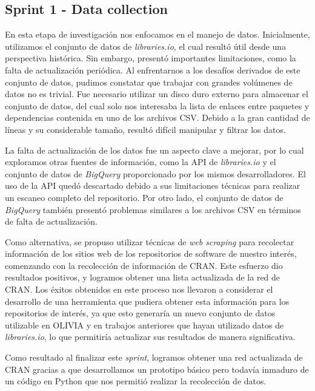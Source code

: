 \subsection{Sprint 1 - Data collection}

En esta etapa de investigación nos enfocamos en el manejo de datos. Inicialmente, utilizamos el conjunto de datos 
de \textit{libraries.io}, el cual resultó útil desde una perspectiva histórica. Sin embargo, presentó importantes 
limitaciones, como la falta de actualización periódica. Al enfrentarnos a los desafíos derivados de este conjunto 
de datos, pudimos constatar que trabajar con grandes volúmenes de datos no es trivial. Fue necesario utilizar un 
disco duro externo para almacenar el conjunto de datos, del cual solo nos interesaba la lista de enlaces entre 
paquetes y dependencias contenida en uno de los archivos CSV. Debido a la gran cantidad de líneas y su considerable 
tamaño, resultó difícil manipular y filtrar los datos.

La falta de actualización de los datos fue un aspecto clave a mejorar, por lo cual exploramos otras fuentes de información, 
como la API de \textit{libraries.io} y el conjunto de datos de \textit{BigQuery} proporcionado por los mismos desarrolladores. 
El uso de la API quedó descartado debido a sus limitaciones técnicas para realizar un escaneo completo del repositorio. 
Por otro lado, el conjunto de datos de \textit{BigQuery} también presentó problemas similares a los archivos CSV en 
términos de falta de actualización.

Como alternativa, se propuso utilizar técnicas de \textit{web scraping} para recolectar información de los sitios web 
de los repositorios de software de nuestro interés, comenzando con la recolección de información de CRAN. Este esfuerzo 
dio resultados positivos, y logramos obtener una lista actualizada de la red de CRAN. Los éxitos obtenidos en este 
proceso nos llevaron a considerar el desarrollo de una herramienta que pudiera obtener esta información para los 
repositorios de interés, ya que esto generaría un nuevo conjunto de datos utilizable en OLIVIA y en trabajos anteriores 
que hayan utilizado datos de \textit{libraries.io}, lo que permitiría actualizar sus resultados de manera significativa.

Como resultado al finalizar este \textit{sprint}, logramos obtener una red actualizada de CRAN gracias a que desarrollamos 
un prototipo básico pero todavía inmaduro de un código en Python que nos permitió realizar la recolección de datos.

